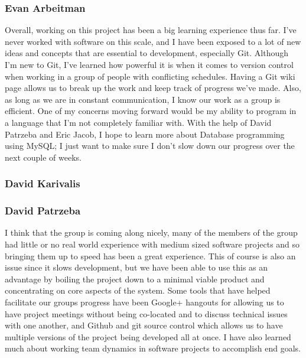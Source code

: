 \subsubsection{Evan Arbeitman}
Overall, working on this project has been a big learning experience thus far.
I've never worked with software on this scale, and I have been exposed to a lot
of new ideas and concepts that are essential to development, especially Git.
Although I'm new to Git, I've learned how powerful it is when it comes to
version control when working in a group of people with conflicting schedules.
Having a Git wiki page allows us to break up the work and keep track of
progress we've made. Also, as long as we are in constant communication, I know
our work as a group is efficient. One of my concerns moving forward would be my
ability to program in a language that I'm not completely familiar with. With
the help of David Patrzeba and Eric Jacob, I hope to learn more about Database
programming using MySQL; I just want to make sure I don't slow down our progress
over the next couple of weeks.

\subsubsection{David Karivalis}

\subsubsection{David Patrzeba}
I think that the group is coming along nicely, many of the members of the group
had little or no real world experience with medium sized software projects and
so bringing them up to speed has been a great experience.  This of course is
also an issue since it slows development, but we have been able to use this as
an advantage by boiling the project down to a minimal viable product and
concentrating on core aspects of the system.  Some tools that have helped
facilitate our groups progress have been Google+ hangouts for allowing us to
have project meetings without being co-located and to discuss technical issues
with one another, and Github and git source control which allows us to have multiple
versions of the project being developed all at once.  I have also learned much
about working team dynamics in software projects to accomplish end goals.\\

